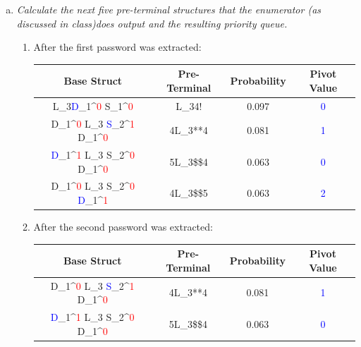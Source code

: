 \newpage
\begin{enumerate}[(a)]
    \item {\itshape Calculate the next five pre-terminal structures that the enumerator (as discussed in class)does output and the resulting priority queue.}
    \begin{enumerate}[1.]
        \item After the first password was extracted:
        
        {\Large
        \begin{tabular}{c|c|c|c}
            \textbf{Base Struct} & \textbf{Pre-Terminal} & \textbf{Probability} & \textbf{Pivot Value}\\ 
            \hline  
            
            L_3\textcolor{blue}{D}_1^{\textcolor{red}{0}} S_1^{\textcolor{red}{0}} & L_34! & 0.097 & \textcolor{blue}{0} \\
            
            D_1^{\textcolor{red}{0}} L_3 \textcolor{blue}{S}_2^{\textcolor{red}{1}} D_1^{\textcolor{red}{0}} & 4L_3**4 & 0.081 & \textcolor{blue}{1} \\
            
            \textcolor{blue}{D}_1^{\textcolor{red}{1}} L_3 S_2^{\textcolor{red}{0}} D_1^{\textcolor{red}{0}} & 5L_3\$\$4 & 0.063 & \textcolor{blue}{0} \\
            
            D_1^{\textcolor{red}{0}} L_3 S_2^{\textcolor{red}{0}} \textcolor{blue}{D}_1^{\textcolor{red}{1}} & 4L_3\$\$5 & 0.063 & \textcolor{blue}{2} \\
        \end{tabular}
        }  
        
        \item After the second password was extracted:
        
        {\Large
        \begin{tabular}{c|c|c|c}
            \textbf{Base Struct} & \textbf{Pre-Terminal} & \textbf{Probability} & \textbf{Pivot Value}\\ 
            \hline  
            
            D_1^{\textcolor{red}{0}} L_3 \textcolor{blue}{S}_2^{\textcolor{red}{1}} D_1^{\textcolor{red}{0}} & 4L_3**4 & 0.081 & \textcolor{blue}{1} \\
            
            \textcolor{blue}{D}_1^{\textcolor{red}{1}} L_3 S_2^{\textcolor{red}{0}} D_1^{\textcolor{red}{0}} & 5L_3\$\$4 & 0.063 & \textcolor{blue}{0} \\
            

\end{tabular}}
\end{enumerate}
\end{enumerate}

